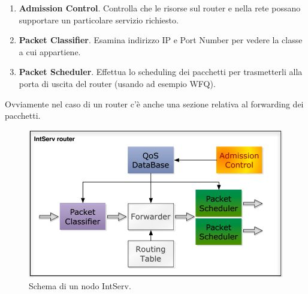 \begin{enumerate}
	\item \textbf{Admission Control}. Controlla che le risorse sul router e nella rete possano supportare un particolare servizio richiesto.
	\item \textbf{Packet Classifier}. Esamina indirizzo IP e Port Number per vedere la classe a cui appartiene.
	\item \textbf{Packet Scheduler}. Effettua lo scheduling dei pacchetti per trasmetterli alla porta di uscita del router (usando ad esempio WFQ).
\end{enumerate}
Ovviamente nel caso di un router c'è anche una sezione relativa al forwarding dei pacchetti.
\begin{figure}[htbp]
	\centering
	\includegraphics[scale = 0.4]{images/int-serv-router}
	\caption{Schema di un nodo IntServ.}
	\label{img:int-serv-router}
\end{figure}
